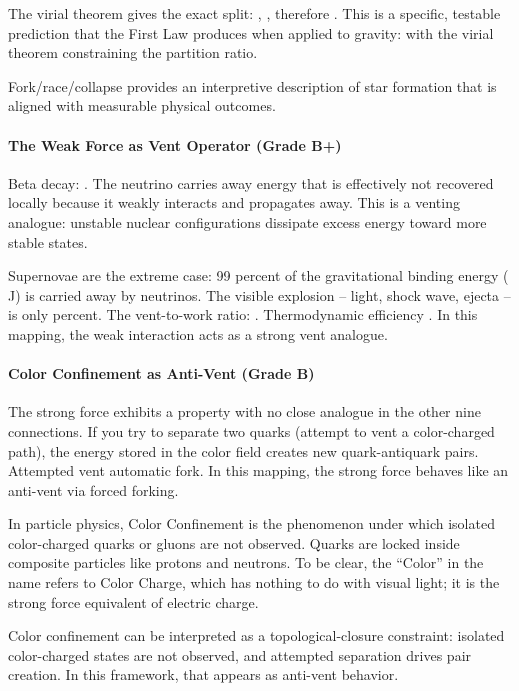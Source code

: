 \documentclass[
]{article}
\begin{document}
The virial theorem gives the exact split: , , therefore . This is a
specific, testable prediction that the First Law produces when applied
to gravity: with the virial theorem constraining the partition ratio.

Fork/race/collapse provides an interpretive description of star
formation that is aligned with measurable physical outcomes.

\paragraph{\texorpdfstring{\textbf{The Weak Force as Vent Operator
(Grade
B+)}}{The Weak Force as Vent Operator (Grade B+)}}\label{the-weak-force-as-vent-operator-grade-b}

Beta decay: . The neutrino carries away energy that is effectively not
recovered locally because it weakly interacts and propagates away. This
is a venting analogue: unstable nuclear configurations dissipate excess
energy toward more stable states.

Supernovae are the extreme case: 99 percent of the gravitational binding
energy ( J) is carried away by neutrinos. The visible explosion --
light, shock wave, ejecta -- is only percent. The vent-to-work ratio: .
Thermodynamic efficiency . In this mapping, the weak interaction acts as
a strong vent analogue.

\paragraph{\texorpdfstring{\textbf{Color Confinement as Anti-Vent (Grade
B)}}{Color Confinement as Anti-Vent (Grade B)}}\label{color-confinement-as-anti-vent-grade-b}

The strong force exhibits a property with no close analogue in the other
nine connections. If you try to separate two quarks (attempt to vent a
color-charged path), the energy stored in the color field creates new
quark-antiquark pairs. Attempted vent automatic fork. In this mapping,
the strong force behaves like an anti-vent via forced forking.

In particle physics, Color Confinement is the phenomenon under which
isolated color-charged quarks or gluons are not observed. Quarks are
locked inside composite particles like protons and neutrons. To be
clear, the ``Color'' in the name refers to Color Charge, which has
nothing to do with visual light; it is the strong force equivalent of
electric charge.

Color confinement can be interpreted as a topological-closure
constraint: isolated color-charged states are not observed, and
attempted separation drives pair creation. In this framework, that
appears as anti-vent behavior.
\end{document}
